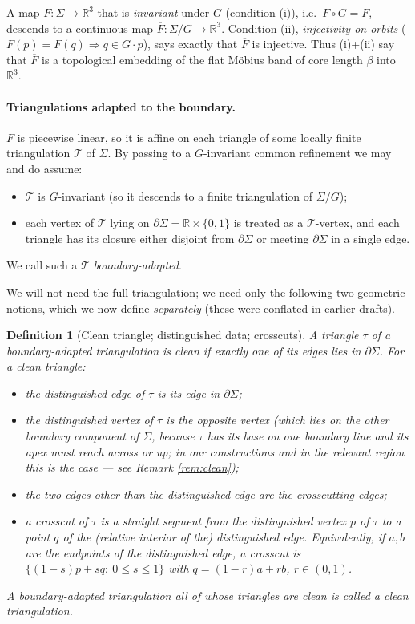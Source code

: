 \documentclass[12pt]{article}
\newtheorem{definition}[theorem]{Definition}
\newcommand{\R}{\mathbb{R}}
\newcommand{\Sig}{\Sigma}
\begin{document}
A map $F:\Sig\to\R^3$ that is \emph{invariant} under $G$
(condition (i)), i.e.\ $F\circ G=F$, descends to a continuous map
$\overline F:\Sig/G\to\R^3$. Condition (ii), \emph{injectivity on
orbits} ($F(p)=F(q)\Rightarrow q\in G\cdot p$), says exactly that
$\overline F$ is injective. Thus (i)+(ii) say that $\overline F$ is a
topological embedding of the flat M\"obius band of core length $\beta$
into $\R^3$.

\paragraph{Triangulations adapted to the boundary.}
$F$ is piecewise linear, so it is affine on each triangle of some
locally finite triangulation $\mathcal T$ of $\Sig$. By passing to a
$G$-invariant common refinement we may and do assume:
\begin{itemize}
\item $\mathcal T$ is $G$-invariant (so it descends to a finite
triangulation of $\Sig/G$);
\item each vertex of $\mathcal T$ lying on $\partial\Sig=\R\times\{0,1\}$
is treated as a $\mathcal T$-vertex, and each triangle has its closure
either disjoint from $\partial\Sig$ or meeting $\partial\Sig$ in a single
edge.
\end{itemize}
We call such a $\mathcal T$ \emph{boundary-adapted}.

We will not need the full triangulation; we need only the following two
geometric notions, which we now define \emph{separately} (these were
conflated in earlier drafts).

\begin{definition}[Clean triangle; distinguished data; crosscuts]
\label{def:clean}
A triangle $\tau$ of a boundary-adapted triangulation is \emph{clean} if
exactly one of its edges lies in $\partial\Sig$. For a clean triangle:
\begin{itemize}
\item the \emph{distinguished edge} of $\tau$ is its edge in
$\partial\Sig$;
\item the \emph{distinguished vertex} of $\tau$ is the opposite vertex
(which lies on the \emph{other} boundary component of $\Sig$, because
$\tau$ has its base on one boundary line and its apex must reach across
or up; in our constructions and in the relevant region this is the
case --- see Remark \ref{rem:clean});
\item the two edges other than the distinguished edge are the
\emph{crosscutting edges};
\item a \emph{crosscut} of $\tau$ is a straight segment from the
distinguished vertex $p$ of $\tau$ to a point $q$ of the (relative
interior of the) distinguished edge. Equivalently, if $a,b$ are the
endpoints of the distinguished edge, a crosscut is
$\{(1-s)p+sq:\ 0\le s\le1\}$ with $q=(1-r)a+rb$, $r\in(0,1)$.
\end{itemize}
A boundary-adapted triangulation all of whose triangles are clean is
called a \emph{clean triangulation}.
\end{definition}
\end{document}

